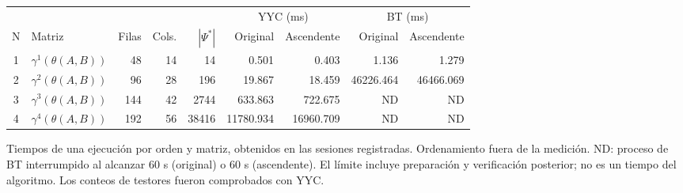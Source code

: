 {\scriptsize
\begin{tabular}{c l r r r r r r r}
\toprule
\multicolumn{5}{c}{} & \multicolumn{2}{c}{YYC (ms)} & \multicolumn{2}{c}{BT (ms)} \\
\cmidrule(lr){6-7}\cmidrule(lr){8-9}
N & Matriz & Filas & Cols. & $|\Psi^*|$ & Original & Ascendente & Original & Ascendente \\
\midrule
1 & $\gamma^{1}(\theta(A,B))$ & 48 & 14 & 14 & 0.501 & 0.403 & 1.136 & 1.279 \\
2 & $\gamma^{2}(\theta(A,B))$ & 96 & 28 & 196 & 19.867 & 18.459 & 46226.464 & 46466.069 \\
3 & $\gamma^{3}(\theta(A,B))$ & 144 & 42 & 2744 & 633.863 & 722.675 & ND & ND \\
4 & $\gamma^{4}(\theta(A,B))$ & 192 & 56 & 38416 & 11780.934 & 16960.709 & ND & ND \\
\bottomrule
\end{tabular}
}
{\footnotesize Tiempos de una ejecución por orden y matriz, obtenidos en las sesiones registradas. Ordenamiento fuera de la medición. ND: proceso de BT interrumpido al alcanzar 60 s (original) o 60 s (ascendente). El límite incluye preparación y verificación posterior; no es un tiempo del algoritmo. Los conteos de testores fueron comprobados con YYC.\par}
